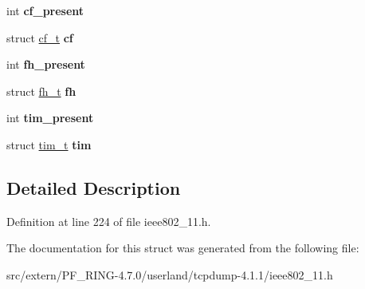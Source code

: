 \begin{DoxyCompactItemize}
\item 
\hypertarget{structmgmt__body__t_ac56fa792dce58b8de156ac03efcffd38}{
int {\bfseries cf\_\-present}}
\label{structmgmt__body__t_ac56fa792dce58b8de156ac03efcffd38}

\item 
\hypertarget{structmgmt__body__t_a5aefc7681a7a4b827bdcee541dbc5f72}{
struct \hyperlink{structcf__t}{cf\_\-t} {\bfseries cf}}
\label{structmgmt__body__t_a5aefc7681a7a4b827bdcee541dbc5f72}

\item 
\hypertarget{structmgmt__body__t_a682fee0052ee5b28e8d2c0e975fbc254}{
int {\bfseries fh\_\-present}}
\label{structmgmt__body__t_a682fee0052ee5b28e8d2c0e975fbc254}

\item 
\hypertarget{structmgmt__body__t_a854db6ed2a16d4aa853d0aa778862fc6}{
struct \hyperlink{structfh__t}{fh\_\-t} {\bfseries fh}}
\label{structmgmt__body__t_a854db6ed2a16d4aa853d0aa778862fc6}

\item 
\hypertarget{structmgmt__body__t_aa4f9fb240e362aa6a286bb291dd12901}{
int {\bfseries tim\_\-present}}
\label{structmgmt__body__t_aa4f9fb240e362aa6a286bb291dd12901}

\item 
\hypertarget{structmgmt__body__t_a441230c9c825d271b71e7813ba55037d}{
struct \hyperlink{structtim__t}{tim\_\-t} {\bfseries tim}}
\label{structmgmt__body__t_a441230c9c825d271b71e7813ba55037d}

\end{DoxyCompactItemize}


\subsection{Detailed Description}


Definition at line 224 of file ieee802\_\-11.h.



The documentation for this struct was generated from the following file:\begin{DoxyCompactItemize}
\item 
src/extern/PF\_\-RING-\/4.7.0/userland/tcpdump-\/4.1.1/ieee802\_\-11.h\end{DoxyCompactItemize}
